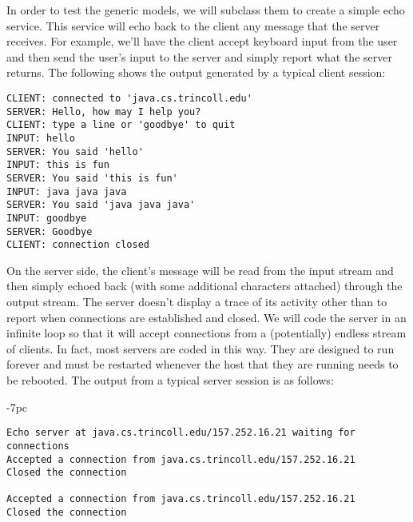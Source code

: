 {In order to test the generic models, we will subclass them to create a
simple echo service.  This service will echo back to the client any
message that the server receives.  For example, we'll have the client
accept keyboard input from the user and then send the user's input to
the server and simply report what the server returns.   The following
shows the output generated by a typical client session:

\begin{jjjlisting}
\begin{lstlisting}
CLIENT: connected to 'java.cs.trincoll.edu'
SERVER: Hello, how may I help you?
CLIENT: type a line or 'goodbye' to quit
INPUT: hello
SERVER: You said 'hello'
INPUT: this is fun
SERVER: You said 'this is fun'
INPUT: java java java
SERVER: You said 'java java java'
INPUT: goodbye
SERVER: Goodbye
CLIENT: connection closed
\end{lstlisting}
\end{jjjlisting}

\noindent On the server side, the client's
message will be read from the input stream and then simply echoed back
(with  some additional characters attached) through the output
stream.  The server doesn't display a trace of its activity other than
to report when connections are established and closed.  We will code
the server in an infinite loop so that it will accept connections
from a (potentially) endless stream of clients.  In fact, most servers
are coded in this way.  They are designed to run forever and must be
restarted whenever the host that they are running needs to be rebooted.
The output from a typical server session is as follows:

\begin{jjjlistingleft}[33pc]{-7pc}
\begin{lstlisting}
Echo server at java.cs.trincoll.edu/157.252.16.21 waiting for connections
Accepted a connection from java.cs.trincoll.edu/157.252.16.21
Closed the connection

Accepted a connection from java.cs.trincoll.edu/157.252.16.21
Closed the connection
\end{lstlisting}
\end{jjjlistingleft}


}

